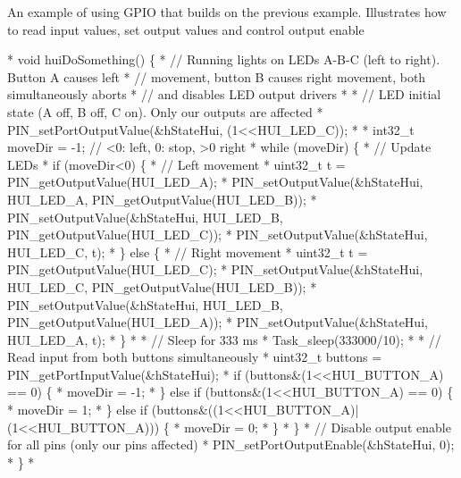 An example of using G\-P\-I\-O that builds on the previous example. Illustrates how to read input values, set output values and control output enable 
\begin{DoxyCode}
*    \textcolor{keywordtype}{void} huiDoSomething() \{
*        \textcolor{comment}{// Running lights on LEDs A-B-C (left to right). Button A causes left}
*        \textcolor{comment}{// movement, button B causes right movement, both simultaneously aborts}
*        \textcolor{comment}{// and disables LED output drivers}
*
*        \textcolor{comment}{// LED initial state (A off, B off, C on). Only our outputs are affected}
*        PIN_setPortOutputValue(&hStateHui, (1<<HUI\_LED\_C));
*
*        int32\_t moveDir = -1;    \textcolor{comment}{// <0: left, 0: stop, >0 right}
*        \textcolor{keywordflow}{while} (moveDir) \{
*            \textcolor{comment}{// Update LEDs}
*            \textcolor{keywordflow}{if} (moveDir<0) \{
*                \textcolor{comment}{// Left movement}
*                uint32\_t t = PIN_getOutputValue(HUI\_LED\_A);
*                PIN_setOutputValue(&hStateHui, HUI\_LED\_A, PIN_getOutputValue(HUI\_LED\_B));
*                PIN_setOutputValue(&hStateHui, HUI\_LED\_B, PIN_getOutputValue(HUI\_LED\_C));
*                PIN_setOutputValue(&hStateHui, HUI\_LED\_C, t);
*            \} \textcolor{keywordflow}{else} \{
*                \textcolor{comment}{// Right movement}
*                uint32\_t t = PIN_getOutputValue(HUI\_LED\_C);
*                PIN_setOutputValue(&hStateHui, HUI\_LED\_C, PIN_getOutputValue(HUI\_LED\_B));
*                PIN_setOutputValue(&hStateHui, HUI\_LED\_B, PIN_getOutputValue(HUI\_LED\_A));
*                PIN_setOutputValue(&hStateHui, HUI\_LED\_A, t);
*            \}
*
*            \textcolor{comment}{// Sleep for 333 ms}
*            Task\_sleep(333000/10);
*
*            \textcolor{comment}{// Read input from both buttons simultaneously}
*            uint32\_t buttons = PIN_getPortInputValue(&hStateHui);
*            \textcolor{keywordflow}{if} (buttons&(1<<HUI\_BUTTON\_A) == 0) \{
*                moveDir = -1;
*            \} \textcolor{keywordflow}{else} \textcolor{keywordflow}{if} (buttons&(1<<HUI\_BUTTON\_A) == 0) \{
*                 moveDir = 1;
*            \} \textcolor{keywordflow}{else} \textcolor{keywordflow}{if} (buttons&((1<<HUI\_BUTTON\_A)|(1<<HUI\_BUTTON\_A))) \{
*                moveDir = 0;
*            \}
*        \}
*        \textcolor{comment}{// Disable output enable for all pins (only our pins affected)}
*        PIN_setPortOutputEnable(&hStateHui, 0);
*    \}
*    
\end{DoxyCode}


